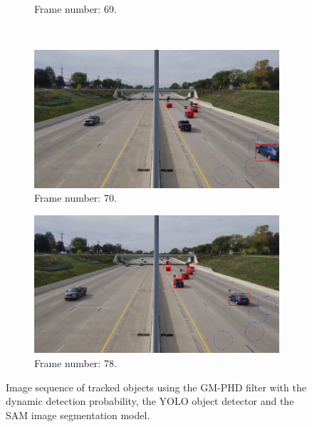 \begin{figure}[H]
\begin{subfigure}{0.48\textwidth}
        \caption{Frame number: 69.}
        \label{fig:E1-V1-S2:06}
    \end{subfigure}
    \\
    \begin{subfigure}{0.48\textwidth}
        \centering
        \includegraphics[width=\linewidth]{../../../experiments/E1/V1/SAM/70}
        \caption{Frame number: 70.}
        \label{fig:E1-V1-S2:07}
    \end{subfigure}
    \begin{subfigure}{0.48\textwidth}
        \centering
        \includegraphics[width=\linewidth]{../../../experiments/E1/V1/SAM/78}
        \caption{Frame number: 78.}
        \label{fig:E1-V1-S2:08}
    \end{subfigure}
    \caption{Image sequence of tracked objects using the GM-PHD filter with the dynamic detection probability, the YOLO
    object detector and the SAM image segmentation model.}
    \label{fig:E1-V1-S2}
\end{figure}


